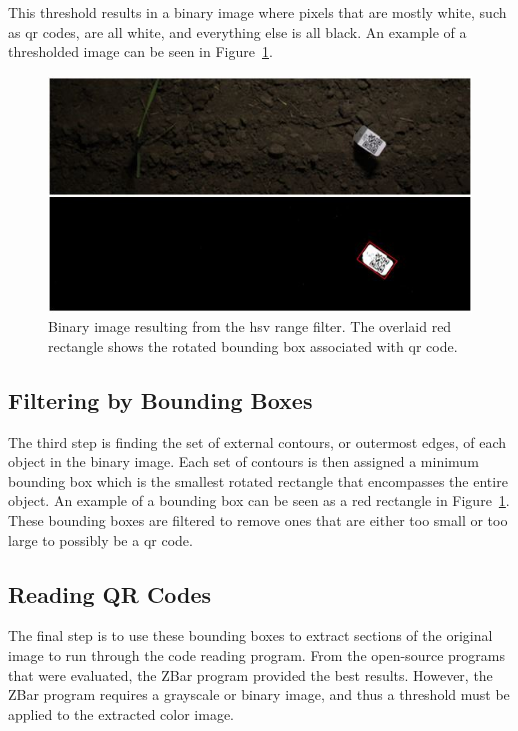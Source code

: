 This threshold results in a binary image where pixels that are mostly white, such as \ac{qr} codes, are all white, and everything else is all black.  An example of a thresholded image can be seen in Figure~\ref{figure:code_extraction}.

\begin{figure}
	\centering
    \includegraphics[width=5in]{figures/code_extraction_step1.jpg}
    \caption[Thresholded image]{Binary image resulting from the \ac{hsv} range filter.  The overlaid red rectangle shows the rotated bounding box associated with \ac{qr} code.}
    \label{figure:code_extraction}
\end{figure} 

\subsection{Filtering by Bounding Boxes}

The third step is finding the set of external contours, or outermost edges, of each object in the binary image.  Each set of contours is then assigned a minimum bounding box which is the smallest rotated rectangle that encompasses the entire object.  An example of a bounding box can be seen as a red rectangle in Figure~\ref{figure:code_extraction}.  These bounding boxes are filtered to remove ones that are either too small or too large to possibly be a \ac{qr} code.

\subsection{Reading QR Codes}
\label{section:reading_codes}

The final step is to use these bounding boxes to extract sections of the original image to run through the code reading program.  From the open-source programs that were evaluated, the ZBar program provided the best results.  However, the ZBar program requires a grayscale or binary image, and thus a threshold must be applied to the extracted color image. 

